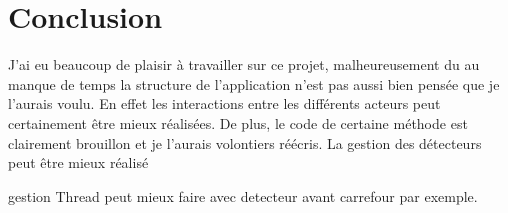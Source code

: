 \documentclass[11pt,a4paper, openany]{memoir}
\begin{document}
\chapter{Conclusion}

J'ai eu beaucoup de plaisir à travailler sur ce projet, malheureusement du au manque de temps la structure de l'application n'est pas aussi bien pensée que je l'aurais voulu. En effet les interactions entre les différents acteurs peut certainement être mieux réalisées. De plus, le code de certaine méthode est clairement brouillon et je l'aurais volontiers réécris. La gestion des détecteurs peut être mieux réalisé

gestion Thread peut mieux faire avec detecteur avant carrefour par exemple.



%
\end{document}
